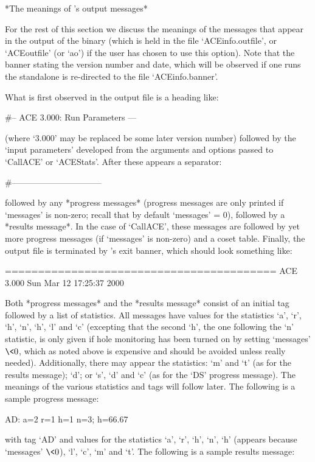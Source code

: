 \enditems

*The meanings of {\ACE}'s output messages*

For the rest of this section we discuss the meanings of  the  messages
that appear in the output of the {\ACE} binary (which is held  in  the
file `ACEinfo.outfile', or `ACEoutfile' (or  `ao')  if  the  user  has
chosen to use this option). Note that the banner stating  the  version
number and date, which will be observed if one runs the standalone  is
re-directed to the file `ACEinfo.banner'.

What is first observed in the {\ACE} output file is a heading like:

\begintt
  #-- ACE 3.000: Run Parameters ---
\endtt

(where `3.000' may be replaced be some later version number)  followed
by the \lq{}input parameters' developed from the arguments and options
passed to `CallACE' or `ACEStats'.  After these appears a separator:

\begintt
  #--------------------------------
\endtt

followed by  any  *progress  messages*  (progress  messages  are  only
printed if `messages' is non-zero; recall that by default `messages' =
0), followed by a *results message*. In the case of  `CallACE',  these
messages are followed by yet more progress messages (if `messages'  is
non-zero) and a coset  table.  Finally,  the  {\ACE}  output  file  is
terminated by {\ACE}'s exit banner, which should look something like:

\begintt
=========================================
ACE 3.000        Sun Mar 12 17:25:37 2000
\endtt

Both *progress messages* and  the  *results  message*  consist  of  an
initial tag followed by a list of statistics. All messages have values
for the statistics `a', `r', `h', `n', `h',  `l'  and  `c'  (excepting
that the second `h', the one following  the  `n'  statistic,  is  only
given if hole monitoring has been turned on by setting `messages'  $\<
0$, which as noted above is expensive and  should  be  avoided  unless
really needed). Additionally, there may appear the statistics: `m' and
`t' (as for the results message); `d'; or `s', `d' and `c' (as for the
`DS' progress message). The meanings of  the  various  statistics  and
tags will follow later. The following is a sample progress message:

\begintt
AD: a=2 r=1 h=1 n=3; h=66.67%
\endtt

with tag `AD' and values for the statistics `a', `r',  `h',  `n',  `h'
(appears because `messages' $\<  0$),  `l',  `c',  `m'  and  `t'.  The
following is a sample results message:

